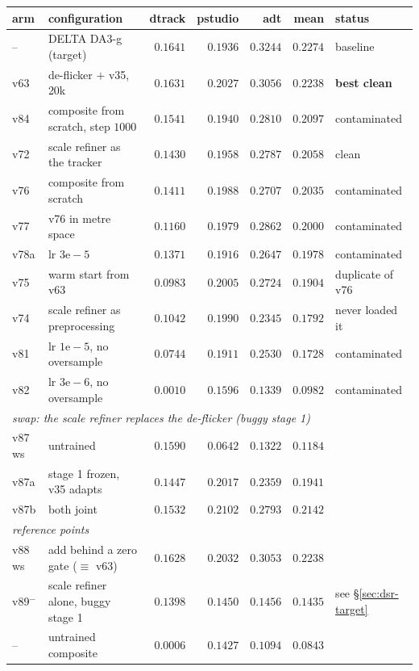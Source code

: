 \documentclass[11pt,a4paper]{article}
\begin{document}
\begin{center}\small
\begin{tabular}{llrrrrl}
\toprule
arm & configuration & dtrack & pstudio & adt & mean & status \\
\midrule
--     & DELTA DA3-g (target)               & $0.1641$ & $0.1936$ & $0.3244$ & $0.2274$ & baseline \\
v63    & de-flicker $+$ v35, 20k            & $0.1631$ & $0.2027$ & $0.3056$ & $0.2238$ & \textbf{best clean} \\
v84    & composite from scratch, step $1000$& $0.1541$ & $0.1940$ & $0.2810$ & $0.2097$ & contaminated \\
v72    & scale refiner as the tracker       & $0.1430$ & $0.1958$ & $0.2787$ & $0.2058$ & clean \\
v76    & composite from scratch             & $0.1411$ & $0.1988$ & $0.2707$ & $0.2035$ & contaminated \\
v77    & v76 in metre space                 & $0.1160$ & $0.1979$ & $0.2862$ & $0.2000$ & contaminated \\
v78a   & lr $3\mathrm{e}{-}5$               & $0.1371$ & $0.1916$ & $0.2647$ & $0.1978$ & contaminated \\
v75    & warm start from v63                & $0.0983$ & $0.2005$ & $0.2724$ & $0.1904$ & duplicate of v76 \\
v74    & scale refiner as preprocessing     & $0.1042$ & $0.1990$ & $0.2345$ & $0.1792$ & never loaded it \\
v81    & lr $1\mathrm{e}{-}5$, no oversample& $0.0744$ & $0.1911$ & $0.2530$ & $0.1728$ & contaminated \\
v82    & lr $3\mathrm{e}{-}6$, no oversample& $0.0010$ & $0.1596$ & $0.1339$ & $0.0982$ & contaminated \\
\midrule
\multicolumn{7}{l}{\emph{swap: the scale refiner replaces the de-flicker (buggy stage 1)}}\\
v87\,ws& untrained                          & $0.1590$ & $0.0642$ & $0.1322$ & $0.1184$ & \\
v87a   & stage 1 frozen, v35 adapts         & $0.1447$ & $0.2017$ & $0.2359$ & $0.1941$ & \\
v87b   & both joint                         & $0.1532$ & $0.2102$ & $0.2793$ & $0.2142$ & \\
\midrule
\multicolumn{7}{l}{\emph{reference points}}\\
v88\,ws& add behind a zero gate ($\equiv$ v63)& $0.1628$ & $0.2032$ & $0.3053$ & $0.2238$ & \\
v89$^{-}$& scale refiner alone, buggy stage 1& $0.1398$ & $0.1450$ & $0.1456$ & $0.1435$ & see \S\ref{sec:dsr-target} \\
--     & untrained composite                & $0.0006$ & $0.1427$ & $0.1094$ & $0.0843$ & \\
\bottomrule
\end{tabular}
\end{center}
\end{document}
